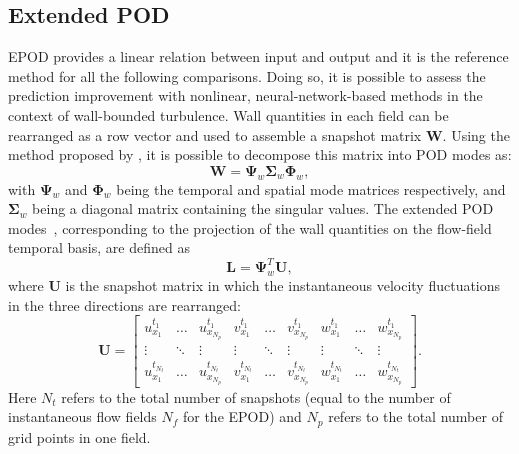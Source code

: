 \subsection{Extended POD}\label{ss:epod}
EPOD provides a linear relation between input and output and it is the reference method for all the following comparisons.
Doing so, it is possible to assess the prediction improvement with nonlinear, neural-network-based methods in the context of wall-bounded turbulence.
Wall quantities in each field can be rearranged as a row vector and used to assemble a snapshot matrix $\mathbf{W}$. Using the method proposed by \citet{sirovich1987turbulence}, it is possible to decompose this matrix into POD modes as:
\begin{equation}
    \mathbf{W}=\boldsymbol{\Psi}_w\boldsymbol{\Sigma}_w\boldsymbol{\Phi}_w,
    \label{wpod0}
\end{equation}
\noindent with $\boldsymbol{\Psi}_w$ and $\boldsymbol{\Phi}_w$ being the temporal and spatial mode matrices respectively, and $\boldsymbol{\Sigma}_w$ being a diagonal matrix containing the singular values.
The extended POD modes~\citep{boree2003extended}, corresponding to the projection of the wall quantities on the flow-field temporal basis, are defined as
\begin{equation}
    \mathbf{L}=\boldsymbol{\Psi}_w^T\mathbf{U},
    \label{wpod1}
\end{equation}
\noindent where $\mathbf{U}$ is the snapshot matrix in which the instantaneous velocity fluctuations in the three directions are rearranged:
\begin{equation}
    \mathbf{U}=\begin{bmatrix}
    u_{x_1}^{t_1} & \dots  & u_{x_{N_p}}^{t_1} & v_{x_1}^{t_1} & \dots  & v_{x_{N_p}}^{t_1} & w_{x_1}^{t_1} & \dots  & w_{x_{N_p}}^{t_1}\\
    \vdots         & \ddots & \vdots         & \vdots         & \ddots & \vdots  & \vdots         & \ddots & \vdots \\
    u_{x_1}^{t_{N_t}} & \dots  & u_{x_{N_p}}^{t_{N_t}} & v_{x_1}^{t_{N_t}} & \dots  & v_{x_{N_p}}^{t_{N_t}}  & w_{x_1}^{t_{N_t}} & \dots  & w_{x_{N_p}}^{t_{N_t}}
    \end{bmatrix}.
    \label{snap}
\end{equation}
Here $N_t$ refers to the total number of snapshots (equal to the number of instantaneous flow fields $N_f$ for the EPOD) and $N_p$ refers to the total number of grid points in one field.

